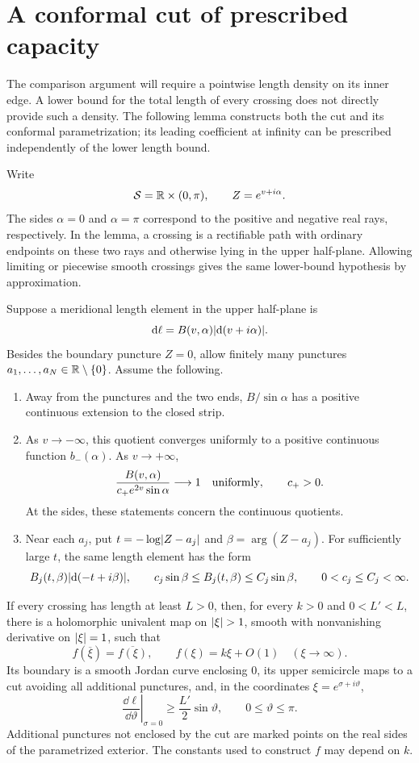 \section{A conformal cut of prescribed capacity}\label{c:section}

The comparison argument will require a pointwise length density on its inner
edge.  A lower bound for the total length of every crossing does not directly
provide such a density.  The following lemma constructs both the cut and its
conformal parametrization; its leading coefficient at infinity can be
prescribed independently of the lower length bound.

Write
\[
 \mathcal S=\mathbb R\times(0,\pi),\qquad Z=e^{v+i\alpha}.
\]
The sides $\alpha=0$ and $\alpha=\pi$ correspond to the positive and negative
real rays, respectively.  In the lemma, a crossing is a rectifiable path with
ordinary endpoints on these two rays and otherwise lying in the upper
half-plane.  Allowing limiting or piecewise smooth crossings gives the same
lower-bound hypothesis by approximation.

\begin{lemma}\label{c:cut}
Suppose a meridional length element in the upper half-plane is
\[
 \mathrm d\ell=B(v,\alpha)\lvert\mathrm d(v+i\alpha)\rvert.
\]
Besides the boundary puncture $Z=0$, allow finitely many punctures
$a_1,\ldots,a_N\in\mathbb R\setminus\{0\}$.  Assume the following.
\begin{enumerate}[label=\textup{(\roman*)}]
\item Away from the punctures and the two ends, $B/\sin\alpha$ has a
positive continuous extension to the closed strip.
\item As $v\to-\infty$, this quotient converges uniformly to a positive
continuous function $b_-(\alpha)$.  As $v\to+\infty$,
\[
 \frac{B(v,\alpha)}{c_+e^{2v}\sin\alpha}\longrightarrow1
 \quad\hbox{uniformly},\qquad c_+>0.
\]
At the sides, these statements concern the continuous quotients.
\item Near each $a_j$, put $t=-\log\lvert Z-a_j\rvert$ and
$\beta=\arg(Z-a_j)$.  For sufficiently large $t$, the same length element
has the form
\[
 B_j(t,\beta)\lvert\mathrm d(-t+i\beta)\rvert,\qquad
 c_j\sin\beta\le B_j(t,\beta)\le C_j\sin\beta,
 \qquad 0<c_j\le C_j<\infty.
\]
\end{enumerate}
If every crossing has length at least $L>0$, then, for every $k>0$ and
$0<L'<L$, there is a holomorphic univalent map on $\lvert\xi\rvert>1$, smooth
with nonvanishing derivative on $\lvert\xi\rvert=1$, such that
\[
 f(\overline\xi)=\overline{f(\xi)},\qquad
 f(\xi)=k\xi+O(1)\quad(\xi\to\infty).
\]
Its boundary is a smooth Jordan curve enclosing $0$, its upper semicircle
maps to a cut avoiding all additional punctures, and, in the coordinates
$\xi=e^{\sigma+i\vartheta}$,
\begin{equation}\label{c:density}
 \left.\frac{\dd\ell}{\dd\vartheta}\right|_{\sigma=0}
 \ge \frac{L'}2\sin\vartheta,
 \qquad 0\le\vartheta\le\pi.
\end{equation}
Additional punctures not enclosed by the cut are marked points on the real
sides of the parametrized exterior.  The constants used to construct $f$
may depend on $k$.
\end{lemma}

